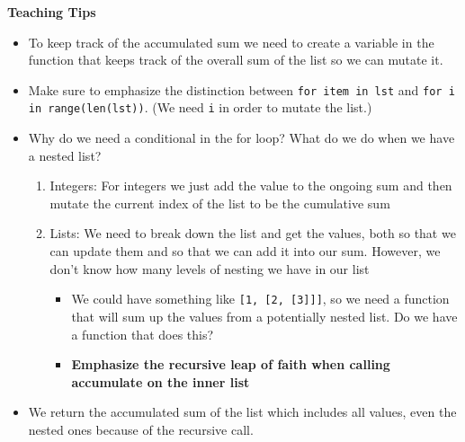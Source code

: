 \begin{guide}
\begin{blocksection}
\textbf{Teaching Tips}

\begin{itemize}
\item To keep track of the accumulated sum we need to create a variable in the function that keeps track of the overall sum of the list so we can mutate it.
\item Make sure to emphasize the distinction between \lstinline{for item in lst} and \lstinline{for i in range(len(lst))}. (We need \lstinline{i} in order to mutate the list.)
\item Why do we need a conditional in the for loop? What do we do when we have a nested list?
\begin{enumerate}
\item Integers:  For integers we just add the value to the ongoing sum and then mutate the current index of the list to be the cumulative sum
\item Lists: We need to break down the list and get the values, both so that we can update them and so that we can add it into our sum.  However, we don’t know how many levels of nesting we have in our list
\begin{itemize} 
\item We could have something like \lstinline{[1, [2, [3]]]}, so we need a function that will sum up the 
values from a potentially nested list.  Do we have a function that does this?
\item \textbf{Emphasize the recursive leap of faith when calling accumulate on the inner list}
\end{itemize}
\end{enumerate}
\item We return the accumulated sum of the list which includes all values, even the nested ones because of the recursive call. 
\end{itemize}
\end{blocksection}
\end{guide}
